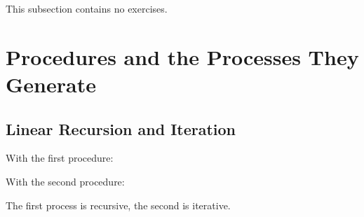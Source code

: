 This subsection contains no exercises.

\section{Procedures and the Processes They Generate}

\subsection{Linear Recursion and Iteration}

\begin{exe}[1.9]
    With the first procedure:

    With the second procedure:

    The first process is recursive, the second is iterative.
\end{exe}

